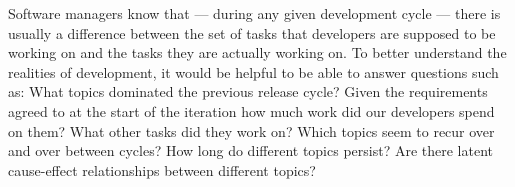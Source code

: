\documentclass[times, 10pt,twocolumn]{article}
\newcommand{\shrinkit}{\vspace*{-.3em}}
\begin{document}
\begin{abstract}
  


\end{abstract}

\shrinkit
{}
\shrinkit

Software managers know that --- during any given development cycle ---
there is usually a difference between the set of tasks that developers
are supposed to be working on and the tasks they are actually working
on.  To better understand the realities of development, it would be
helpful to be able to answer questions such as: What topics dominated
the previous release cycle? Given the requirements agreed to at the
start of the iteration how much work did our developers spend on them?
What other tasks did they work on?  Which topics seem to recur over
and over between cycles?  How long do different topics persist?  Are
there latent cause-effect relationships between different topics?



\end{document}

